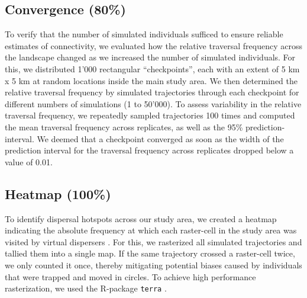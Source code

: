 \documentclass[abstract=on,10pt,a4paper,bibliography=totocnumbered]{article}
\begin{document}
\subsection{Convergence (80\%)}
To verify that the number of simulated individuals sufficed to ensure reliable
estimates of connectivity, we evaluated how the relative traversal frequency
across the landscape changed as we increased the number of simulated
individuals. For this, we distributed 1'000 rectangular ``checkpoints'', each
with an extent of 5 km x 5 km at random locations inside the main study area. We
then determined the relative traversal frequency by simulated trajectories
through each checkpoint for different numbers of simulations (1 to 50'000). To
assess variability in the relative traversal frequency, we repeatedly sampled
trajectories 100 times and computed the mean traversal frequency across
replicates, as well as the 95\% prediction-interval. We deemed that a checkpoint
converged as soon as the width of the prediction interval for the traversal
frequency across replicates dropped below a value of 0.01.

\subsection{Heatmap (100\%)}
To identify dispersal hotspots across our study area, we created a heatmap
indicating the absolute frequency at which each raster-cell in the study area
was visited by virtual dispersers \citep{Hauenstein.2019, Peer.2008}. For this,
we rasterized all simulated trajectories and tallied them into a single map. If
the same trajectory crossed a raster-cell twice, we only counted it once,
thereby mitigating potential biases caused by individuals that were trapped and
moved in circles. To achieve high performance rasterization, we used the
R-package {\tt terra} \citep{Hijmans.2020}.
\end{document}
